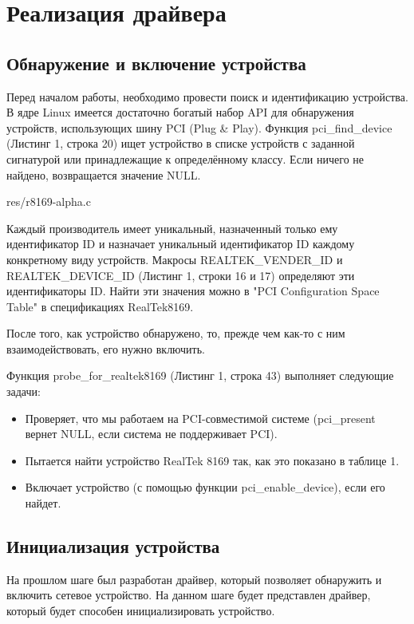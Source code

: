 \newpage
\section{Реализация драйвера}
\subsection{Обнаружение и включение устройства}

Перед началом работы, необходимо провести поиск и идентификацию устройства. В ядре Linux имеется достаточно богатый набор API для обнаружения устройств, использующих шину PCI (Plug \& Play). Функция pci\_find\_device (Листинг 1, строка 20) ищет устройство в списке устройств с заданной сигнатурой или принадлежащие к определённому классу. Если ничего не найдено, возвращается значение NULL.


{res/r8169-alpha.c}

Каждый производитель имеет уникальный, назначенный только ему идентификатор ID и назначает уникальный идентификатор ID каждому конкретному виду устройств. Макросы REALTEK\_VENDER\_ID и REALTEK\_DEVICE\_ID (Листинг 1, строки 16 и 17) определяют эти идентификаторы ID. Найти эти значения можно в "PCI Configuration Space Table" в спецификациях RealTek8169\cite{Realtech}.

После того, как устройство обнаружено, то, прежде чем как-то с ним взаимодействовать, его нужно включить. 

Функция probe\_for\_realtek8169 (Листинг 1, строка 43) выполняет следующие задачи:

\begin{itemize}
\item Проверяет, что мы работаем на PCI-совместимой системе (pci\_present вернет NULL, если система не поддерживает PCI).
\item Пытается найти устройство RealTek 8169 так, как это показано в таблице 1.
\item Включает устройство (с помощью функции pci\_enable\_device), если его найдет.
\end{itemize}

\subsection{Инициализация устройства}

На прошлом шаге был разработан драйвер, который позволяет обнаружить и включить сетевое устройство. На данном шаге будет представлен драйвер, который будет способен инициализировать устройство.

